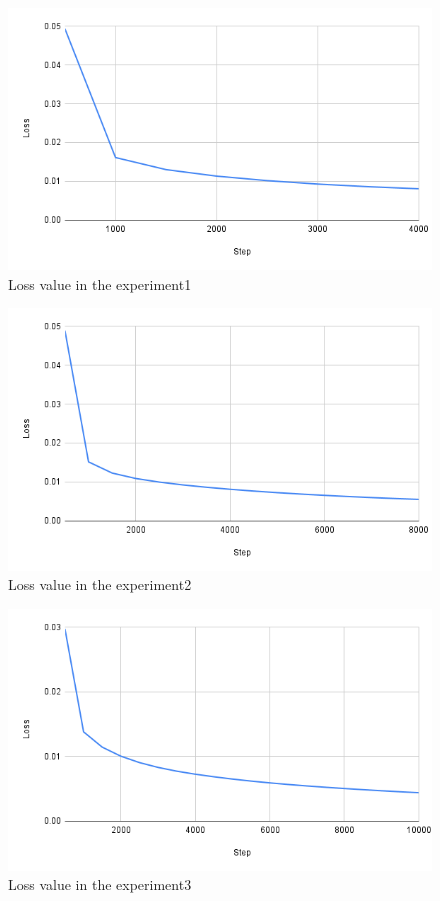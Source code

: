 \newpage
\begin{figure}[h]
  \centering
  \includegraphics[keepaspectratio, scale=0.31]{images/exp1.2_4000.png}
  \caption{Loss value in the experiment1}
  \label{Fig:exp1.2_4000}
  \end{figure}
  
\begin{figure}[h]
  \centering
  \includegraphics[keepaspectratio, scale=0.31]{images/exp1.2_8000.png}
  \caption{Loss value in the experiment2}
  \label{Fig:exp1.2_8000}
  \end{figure}

\begin{figure}[h]
  \centering
  \includegraphics[keepaspectratio, scale=0.31]{images/exp1.2_10000.png}
  \caption{Loss value in the experiment3}
  \label{Fig:exp1.2_10000}
  \end{figure}

